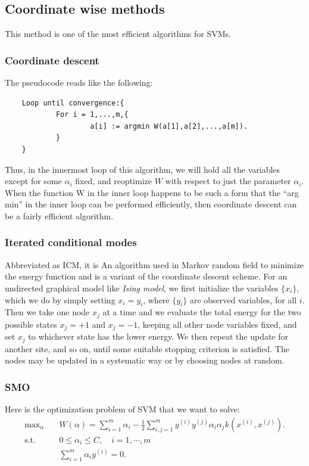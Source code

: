 \documentclass[a4paper]{report}
\begin{document}
\subsection{Coordinate wise methods}
This method is one of the most efficient algorithms for SVMs.
\subsubsection{Coordinate descent}
The pseudocode reads like the following:
\begin{verbatim}
    Loop until convergence:{
	        For i = 1,...,m,{
		            a[i] := argmin W(a[1],a[2],...,a[m]).
    	    }
    }
\end{verbatim}
Thus, in the innermost loop of this algorithm, we will hold all the variables except for some $\alpha_i$ fixed, and reoptimize $W$ with respect to just the parameter $\alpha_i$. When the function W in the inner loop happens to be such a form that the ``arg min'' in the inner loop can be performed efficiently, then coordinate descent can be a fairly efficient algorithm.
\subsubsection{Iterated conditional modes}
Abbreviated as ICM, it is An algorithm used in Markov random field to minimize the energy function and is a variant of the coordinate descent scheme. For an undirected graphical model like \emph{Ising model}, we first initialize the variables $\{x_i\}$, which we do by simply setting $x_i = y_i$, where $\{y_i\}$ are observed variables, for all $i$. Then we take one node $x_j$ at a time and we evaluate the total energy for the two possible states $x_j = + 1$ and $x_j = -1$, keeping all other node variables fixed, and set $x_j$ to whichever state has the lower energy. We then repeat the update for another site, and so on, until some suitable stopping criterion is satisfied. The nodes may be updated in a systematic way or by choosing nodes at random.
\subsubsection{SMO}\label{SMO}
Here is the optimization problem of SVM that we want to solve:
\begin{align}
\text{max}_{\alpha} &\quad W(\alpha) = \sum_{i=1}^{m} \alpha_i - \frac{1}{2} \sum_{i,j=1}^{m} y^{(i)}y^{(j)}\alpha_i \alpha_j k(x^{(i)},x^{(j)}).\\
\text{s.t.} &\quad 0 \leq \alpha_i \leq C, \quad i=1,\cdots,m  \label{SMOb}\\
&\quad \sum_{i=1}^{m} \alpha_i y^{(i)} = 0. \label{SMOc}
\end{align}
\end{document}
